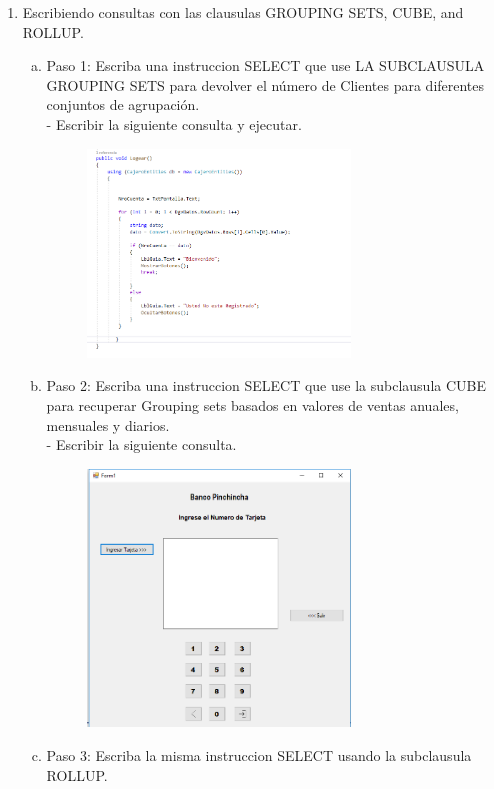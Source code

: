 \begin{enumerate}[1.]
	\item Escribiendo consultas con las clausulas GROUPING SETS, CUBE, and ROLLUP.
	\begin{enumerate}[a)]
	\item Paso 1: Escriba una instruccion SELECT que use LA SUBCLAUSULA GROUPING SETS para devolver el número de
Clientes para diferentes conjuntos de agrupación.\\
		-  Escribir la siguiente consulta y ejecutar. 
		\begin{figure}[H]
		\begin{center}
		\includegraphics[width=7cm]{./Imagenes/img12}
		\end{center}
		\end{figure}
	\item Paso 2: Escriba una instruccion SELECT que use la subclausula CUBE para recuperar Grouping sets basados en valores de ventas anuales, mensuales y diarios.\\
		-  Escribir la siguiente consulta. 
		\begin{figure}[H]
		\begin{center}
		\includegraphics[width=7cm]{./Imagenes/img13}
		\end{center}
		\end{figure}
	\item Paso 3: Escriba la misma instruccion SELECT usando la subclausula ROLLUP.\\

\end{enumerate}
\end{enumerate}
